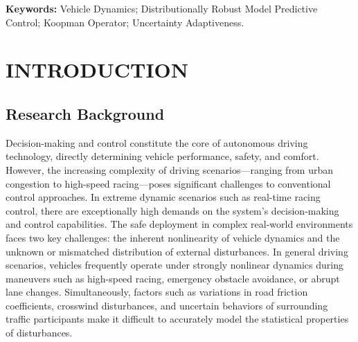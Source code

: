 \documentclass[pdflatex,sn-mathphys,Numbered]{sn-jnl}
\numberwithin{equation}{section}
\begin{document}
\begin{abstract}
This paper proposes a Koopman-based distributionally robust MPC framework for autonomous vehicle obstacle avoidance under disturbance uncertainty. The tracking objective is an empirical expected cost over historical disturbance trajectories. For each obstacle-time constraint, a shifted-hinge loss and Markov's inequality yield a conservative sufficient condition for a distributionally robust chance constraint over a first-order Wasserstein ambiguity set. For fixed safety-margin parameters, this condition results in affine safety constraints and preserves the convex QP structure. The simulation results in the current draft were generated with the previous safety formulation and will be replaced after rerunning the experiments under the revised condition.
\end{abstract}

\noindent\textbf{Keywords:} Vehicle Dynamics; Distributionally Robust Model Predictive Control; Koopman Operator; Uncertainty Adaptiveness.

\bigskip
\fi
	
	\section{INTRODUCTION}
	\label{sec1}
	
	\subsection{Research Background}
	\label{subsec:background}
	
	Decision-making and control constitute the core of autonomous driving technology, directly determining vehicle performance, safety, and comfort. However, the increasing complexity of driving scenarios—ranging from urban congestion to high-speed racing—poses significant challenges to conventional control approaches. In extreme dynamic scenarios such as real-time racing control, there are exceptionally high demands on the system's decision-making and control capabilities. The safe deployment in complex real-world environments faces two key challenges: the inherent nonlinearity of vehicle dynamics and the unknown or mismatched distribution of external disturbances. In general driving scenarios, vehicles frequently operate under strongly nonlinear dynamics during maneuvers such as high-speed racing, emergency obstacle avoidance, or abrupt lane changes. Simultaneously, factors such as variations in road friction coefficients, crosswind disturbances, and uncertain behaviors of surrounding traffic participants make it difficult to accurately model the statistical properties of disturbances.
	
\end{document}
